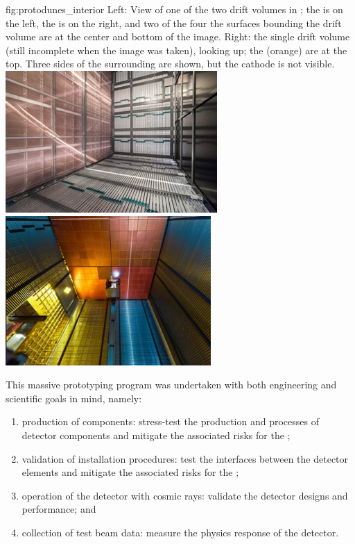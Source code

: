 \begin{dunefigure}
{fig:protodunes_interior}
{Left: View of one of the two drift volumes in ; the  is on the left, the  is on the right, and two of the four the  surfaces bounding the drift volume are at the center and bottom of the image.  Right:  the single  drift volume (still incomplete when the image was taken), looking up; the  (orange) are at the top. Three sides of the surrounding  are shown, but the cathode is not visible.}
\includegraphics[width=0.46\linewidth]{graphics/ProtoDUNE-sp-interior.jpg}\hspace{0.05\linewidth}
\includegraphics[width=0.44\linewidth]{graphics/protodune-dp-interior.jpg}
\end{dunefigure}

This massive prototyping program was undertaken with both engineering and scientific goals in mind, namely: 
 
\begin{enumerate}
\item production of components: stress-test the production and  processes of detector components and mitigate the associated risks for the ;
\item validation of installation procedures: test the interfaces between the detector elements
and mitigate the associated risks for the ;
\item operation of the detector with cosmic rays: validate the detector designs and performance; and 
\item collection of test beam data: measure the physics response of the detector.
\end{enumerate}



